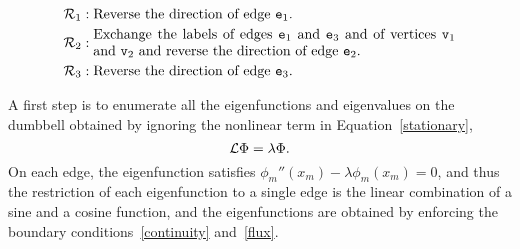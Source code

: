 \documentclass{article}
\numberwithin{equation}{section}
\numberwithin{figure}{section}
\begin{document}
\begin{equation}
\label{dumbbellSymmetries}
\begin{split}
\cR_1:& \;\text{Reverse the direction of edge $\te_1$.} \\
\cR_2: &\;\text{\parbox{.75\textwidth}{Exchange the labels of edges $\te_1$ and $\te_3$ and of vertices $\tv_1$ and $\tv_2$ and reverse the direction of edge $\te_2$.}} \\
\cR_3: &\;\text{Reverse the direction of edge $\te_3$.}
\end{split}
\end{equation}

A first step is to  enumerate all the eigenfunctions and eigenvalues on the dumbbell obtained by ignoring the nonlinear term in Equation~\eqref{stationary},
\begin{equation}
\mathcal{L} \Phi  = \lambda \Phi.
\label{eigenproblem} 
\end{equation}
On each edge, the eigenfunction satisfies $\phi_m''(x_m) - \lambda \phi_m(x_m) = 0$, and thus the restriction of each eigenfunction to a single edge is the linear combination of a sine and a cosine function, and the eigenfunctions are obtained by enforcing the boundary conditions~\eqref{continuity} and~\eqref{flux}.
\end{document}
